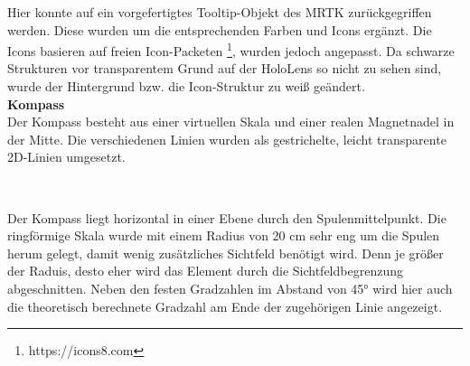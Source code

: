 Hier konnte auf ein vorgefertigtes Tooltip-Objekt des MRTK zurückgegriffen werden. Diese wurden um die entsprechenden Farben und Icons ergänzt. Die Icons basieren auf freien Icon-Packeten \footnote{https://icons8.com}, wurden jedoch angepasst. Da schwarze Strukturen vor transparentem Grund auf der HoloLens so nicht zu sehen sind, wurde der Hintergrund bzw. die Icon-Struktur zu weiß geändert.\\

\textbf{Kompass}\\
Der Kompass besteht aus einer virtuellen Skala und einer realen Magnetnadel in der Mitte. Die verschiedenen Linien wurden als gestrichelte, leicht transparente 2D-Linien umgesetzt.
\vspace{4px}
\begin{center}
	\\
\end{center}
\vspace{6px}

Der Kompass liegt horizontal in einer Ebene durch den Spulenmittelpunkt. Die ringförmige Skala wurde mit einem Radius von 20 cm sehr eng um die Spulen herum gelegt, damit wenig zusätzliches Sichtfeld benötigt wird. Denn je größer der Raduis, desto eher wird das Element durch die Sichtfeldbegrenzung abgeschnitten. Neben den festen Gradzahlen im Abstand von 45° wird hier auch die theoretisch berechnete Gradzahl am Ende der zugehörigen Linie angezeigt.\\

